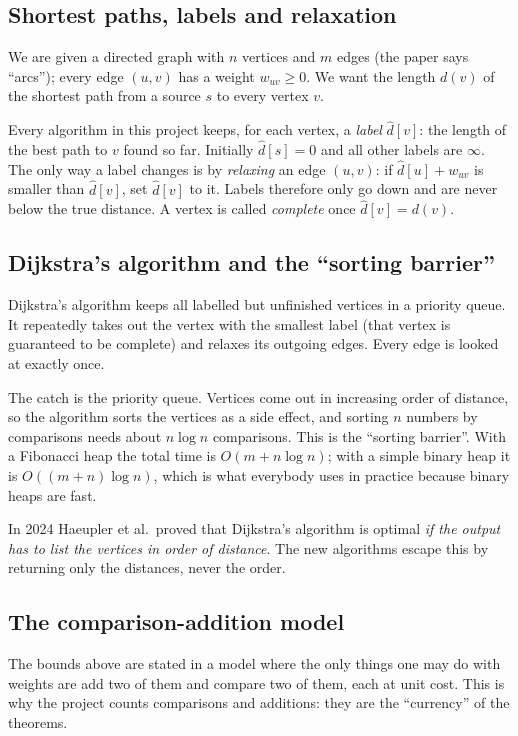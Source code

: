 \documentclass[11pt,a4paper]{article}
\newcommand{\dhat}{\widehat{d}}
\begin{document}
\subsection{Shortest paths, labels and relaxation}
We are given a directed graph with $n$ vertices and $m$ edges (the paper says ``arcs''); every edge $(u,v)$ has a weight $w_{uv}\ge 0$. We want the length $d(v)$ of the shortest path from a source $s$ to every vertex $v$.

Every algorithm in this project keeps, for each vertex, a \emph{label} $\dhat[v]$: the length of the best path to $v$ found so far. Initially $\dhat[s]=0$ and all other labels are $\infty$. The only way a label changes is by \emph{relaxing} an edge $(u,v)$: if $\dhat[u]+w_{uv}$ is smaller than $\dhat[v]$, set $\dhat[v]$ to it. Labels therefore only go down and are never below the true distance. A vertex is called \emph{complete} once $\dhat[v]=d(v)$.

\subsection{Dijkstra's algorithm and the ``sorting barrier''}
Dijkstra's algorithm keeps all labelled but unfinished vertices in a priority queue. It repeatedly takes out the vertex with the smallest label (that vertex is guaranteed to be complete) and relaxes its outgoing edges. Every edge is looked at exactly once.

The catch is the priority queue. Vertices come out in increasing order of distance, so the algorithm sorts the vertices as a side effect, and sorting $n$ numbers by comparisons needs about $n\log n$ comparisons. This is the ``sorting barrier''. With a Fibonacci heap the total time is $O(m+n\log n)$; with a simple binary heap it is $O((m+n)\log n)$, which is what everybody uses in practice because binary heaps are fast.

In 2024 Haeupler et al.\ proved that Dijkstra's algorithm is optimal \emph{if the output has to list the vertices in order of distance}. The new algorithms escape this by returning only the distances, never the order.

\subsection{The comparison-addition model}
The bounds above are stated in a model where the only things one may do with weights are add two of them and compare two of them, each at unit cost. This is why the project counts comparisons and additions: they are the ``currency'' of the theorems.
\end{document}
